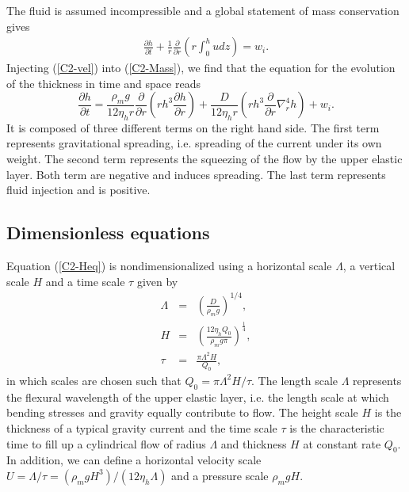 The fluid  is assumed  incompressible and a  global statement  of mass
conservation gives
\begin{eqnarray}
  \frac{\partial         h}{\partial        t} +\frac{1}{r}
  \frac{\partial}{\partial
  r} \left( r\int_0^hudz\right) = w_i.
  \label{C2-Mass}
\end{eqnarray}
Injecting  (\ref{C2-vel})  into  (\ref{C2-Mass}),  we  find  that  the
equation for the evolution of the thickness in time and space reads
\begin{equation}
  \frac{\partial h}{\partial t} =\frac{\rho_mg}{12 \eta_h r}
  \frac{\partial}{\partial r}  \left( rh^3  \frac{\partial h}{\partial
      r}\right)+\frac{D}{12\eta_h r} \left( rh^3 \frac{\partial}{\partial r}\nabla_r^4h\right)+
  w_i .\label{C2-Heq}
\end{equation}
It is  composed of three different  terms on the right  hand side. The
first term represents gravitational  spreading, i.e.  spreading of the
current under its own weight. The second term represents the squeezing
of the  flow by the upper  elastic layer.  Both term  are negative and
induces spreading.   The last term  represents fluid injection  and is
positive.

\subsection{Dimensionless equations}
\label{C2-sec:dimens-equat}

Equation (\ref{C2-Heq}) is nondimensionalized using a horizontal scale
$\Lambda$, a vertical scale $H$ and a time scale $\tau$ given by
\begin{eqnarray}
  \Lambda &=& \left(\frac{D}{\rho_m g}\right)^{1/4},\label{C2-L1}\\
  H&=&\left       (\frac{12\eta_h      Q_{0}}{\rho_{m}g       \pi}\right      )
       ^{\frac{1}{4}} ,\label{C2-H1}\\
  \tau&=&\frac{\pi \Lambda^{2} H}{Q_{0}},\label{C2-T1}
\end{eqnarray}
in which scales are chosen such  that $Q_0 = \pi\Lambda^2 H/\tau$. The
length scale $\Lambda$ represents the flexural wavelength of the upper
elastic layer,  i.e. the  length scale at  which bending  stresses and
gravity  equally contribute  to flow.   The  height scale  $H$ is  the
thickness of  a typical gravity current  and the time scale  $\tau$ is
the  characteristic time  to  fill  up a  cylindrical  flow of  radius
$\Lambda$ and thickness  $H$ at constant rate $Q_0$.   In addition, we
can       define        a       horizontal        velocity       scale
$U=\Lambda/\tau=\left(\rho_m           g           H^3\right)/\left(12
  \eta_h\Lambda\right)$ and a pressure scale $\rho_m g H$.

